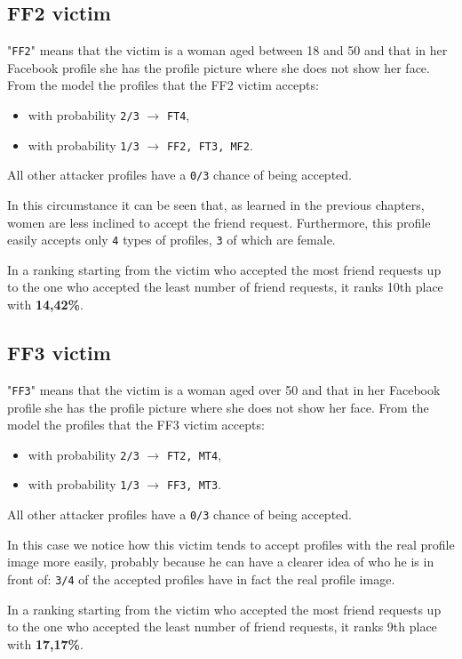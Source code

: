 \subsection*{FF2 victim}
"\texttt{FF2}" means that the victim is a woman aged between 18 and 50 and that in her Facebook profile she has the profile picture where she does not show her face.
From the model the profiles that the FF2 victim accepts:
\begin{itemize}
	\item with probability \texttt{2/3} $\rightarrow$ \texttt{FT4},
	\item with probability \texttt{1/3} $\rightarrow$ \texttt{FF2, FT3, MF2}.
\end{itemize}  
All other attacker profiles have a \texttt{0/3} chance of being accepted.
\par \noindent In this circumstance it can be seen that, as learned in the previous chapters, women are less inclined to accept the friend request. Furthermore, this profile easily accepts only \texttt{4} types of profiles, \texttt{3} of which are female.
\par \noindent In a ranking starting from the victim who accepted the most friend requests up to the one who accepted the least number of friend requests, it ranks 10th place with \textbf{14,42\%}.


\subsection*{FF3 victim}
"\texttt{FF3}" means that the victim is a woman aged over 50 and that in her Facebook profile she has the profile picture where she does not show her face.
From the model the profiles that the FF3 victim accepts:
\begin{itemize}
	\item with probability \texttt{2/3} $\rightarrow$ \texttt{FT2, MT4},
	\item with probability \texttt{1/3} $\rightarrow$ \texttt{FF3, MT3}.
\end{itemize}  
All other attacker profiles have a \texttt{0/3} chance of being accepted.
\par \noindent In this case we notice how this victim tends to accept profiles with the real profile image more easily, probably because he can have a clearer idea of who he is in front of: \texttt{3/4} of the accepted profiles have in fact the real profile image.
\par \noindent In a ranking starting from the victim who accepted the most friend requests up to the one who accepted the least number of friend requests, it ranks 9th place with \textbf{17,17\%}.


